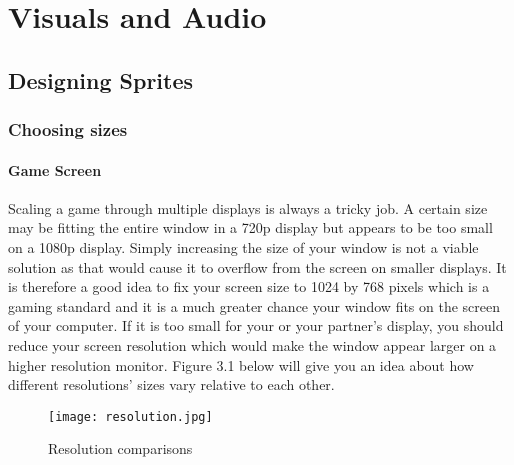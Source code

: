 \documentclass[11pt,fleqn]{book} %
\begin{document}
     
    
    
\part{Visuals and Audio}

\chapter{Designing Sprites} %
    \section{Choosing sizes}
        \subsection{Game Screen}
        Scaling a game through multiple displays is always a tricky job. A certain size may be fitting the entire window in a 720p display but appears to be too small on a 1080p display. Simply increasing the size of your window is not a viable solution as that would cause it to overflow from the screen on smaller displays. It is therefore a good idea to fix your screen size to 1024 by 768 pixels which is a gaming standard and it is a much greater chance your window fits on the screen of your computer. If it is too small for your or your partner's display, you should reduce your screen resolution which would make the window appear larger on a higher resolution monitor. Figure 3.1 below will give you an idea about how different resolutions' sizes vary relative to each other.
        \begin{figure}[ht]
            \centering
            \texttt{[image: resolution.jpg]}
            \caption{Resolution comparisons}
            \label{fig:my_label}
        \end{figure}
       
\end{document}
